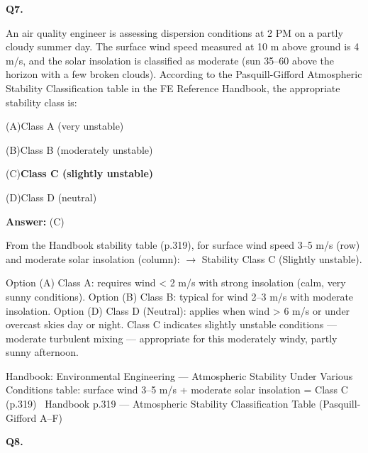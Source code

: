 \documentclass[11pt]{article}
\newcommand{\correct}[1]{\textbf{#1}\;{\color{accent}$\checkmark$}}
\newcommand{\optline}[2]{\par\noindent\hspace{1.2em}(#1)\hspace{0.6em}#2}
\begin{document}
\filbreak
\textbf{\color{accent}Q7.}\par\vspace{2pt}
An air quality engineer is assessing dispersion conditions at 2 PM on a partly cloudy summer day. The surface wind speed measured at 10 m above ground is 4 m/s, and the solar insolation is classified as moderate (sun 35--60\textdegree{} above the horizon with a few broken clouds). According to the Pasquill-Gifford Atmospheric Stability Classification table in the FE Reference Handbook, the appropriate stability class is:\par\vspace{3pt}
\optline{A}{Class A (very unstable)}
\optline{B}{Class B (moderately unstable)}
\optline{C}{\correct{Class C (slightly unstable)}}
\optline{D}{Class D (neutral)}
\par\vspace{3pt}
\vspace{2pt}\par\noindent\colorbox{boxbg}{\parbox{\dimexpr\linewidth-2\fboxsep\relax}{%
\vspace{2pt}\textbf{Answer:} (C)\par\vspace{2pt}
{\small From the Handbook stability table (p.319), for surface wind speed 3--5 m/s (row) and moderate solar insolation (column):
$\rightarrow$ Stability Class C (Slightly unstable).

Option (A) Class A: requires wind < 2 m/s with strong insolation (calm, very sunny conditions). Option (B) Class B: typical for wind 2--3 m/s with moderate insolation. Option (D) Class D (Neutral): applies when wind > 6 m/s or under overcast skies day or night. Class C indicates slightly unstable conditions --- moderate turbulent mixing --- appropriate for this moderately windy, partly sunny afternoon.}\par\vspace{2pt}
{\footnotesize\color{soft}Handbook: Environmental Engineering --- Atmospheric Stability Under Various Conditions table: surface wind 3--5 m/s + moderate solar insolation = Class C (p.319) \textbullet\ Handbook p.319 --- Atmospheric Stability Classification Table (Pasquill-Gifford A--F)}\vspace{2pt}
}}
\vspace{9pt}
\filbreak
\textbf{\color{accent}Q8.}\par\vspace{2pt}
\end{document}
